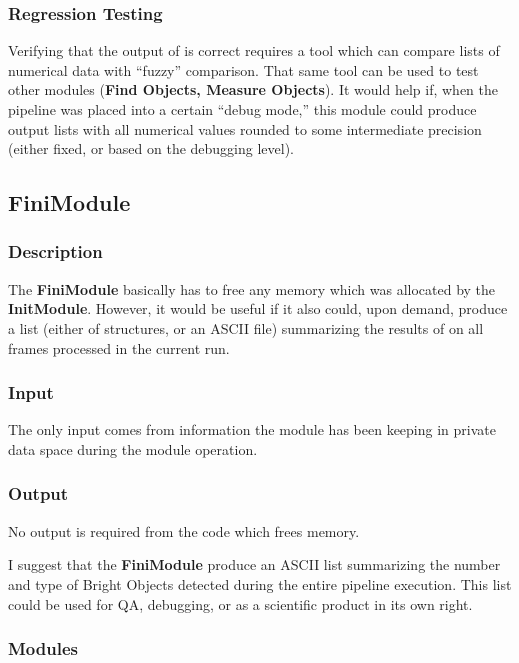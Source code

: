 \subsubsection {Regression Testing}

  Verifying that the output of \bom is correct requires
a tool which can compare lists of numerical data with 
``fuzzy'' comparison.  That same tool can be used to
test other modules ({\bf Find Objects, Measure Objects}).
It would help if, when the pipeline was placed into 
a certain ``debug mode,'' this module could produce
output lists with all numerical values rounded to 
some intermediate precision (either fixed, or based on 
the debugging level).

\subsection {FiniModule}

\subsubsection {Description}

  The {\bf FiniModule} basically has to free any memory
which was allocated by the {\bf InitModule}.  However, 
it would be useful if it also could, upon demand,
produce a list (either of structures, or an ASCII file)
summarizing the results of \bom on all frames processed
in the current run.

\subsubsection {Input}

  The only input comes from information the module
has been keeping in private data space during the 
module operation.

\subsubsection {Output}

  No output is required from the code which frees memory.

  I suggest that the {\bf FiniModule} produce an ASCII
list summarizing the number and type of Bright Objects
detected during the entire pipeline execution.
This list could be used for QA, debugging, or as a
scientific product in its own right.

\subsubsection {Modules}

